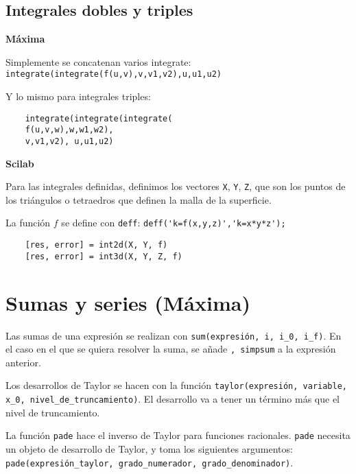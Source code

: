 \documentclass[a4paper]{article}
\begin{document}
\subsection{Integrales dobles y triples}
\begin{multicols}{2}
	\begin{center}
		\textbf{Máxima}
	\end{center}
	Simplemente se concatenan varios integrate:
	\verb|integrate(integrate(f(u,v),v,v1,v2),u,u1,u2)|
	
	Y lo mismo para integrales triples:
	\begin{verbatim}
	integrate(integrate(integrate(
	f(u,v,w),w,w1,w2),
	v,v1,v2), u,u1,u2)
	\end{verbatim}
	

	\columnbreak
	
	\begin{center}
		\textbf{Scilab}
	\end{center}
	Para las integrales definidas, definimos los vectores \verb|X|, \verb|Y|, \verb|Z|, que son los puntos de los triángulos o tetraedros que definen la malla de la superficie.
	
	La función $f$ se define con \verb|deff|:
	\verb|deff('k=f(x,y,z)','k=x*y*z');|
	\begin{verbatim}
	[res, error] = int2d(X, Y, f)
	[res, error] = int3d(X, Y, Z, f)
	\end{verbatim}
	
\end{multicols}



\raggedright
\section{Sumas y series (Máxima)}

Las sumas de una expresión se realizan con \verb|sum(expresión, i, i_0, i_f)|. En el caso en el que se quiera resolver la suma, se añade \verb|, simpsum| a la expresión anterior.

Los desarrollos de Taylor se hacen con la función \verb|taylor(expresión, variable, x_0, nivel_de_truncamiento)|. El desarrollo va a tener un término más que el nivel de truncamiento.

La función \verb|pade| hace el inverso de Taylor para funciones racionales. \verb|pade| necesita un objeto de desarrollo de Taylor, y toma los siguientes argumentos: \verb|pade(expresión_taylor, grado_numerador, grado_denominador)|. 
\end{document}
